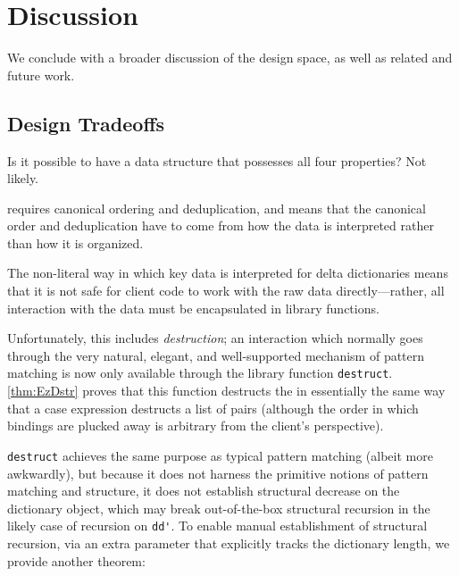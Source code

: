 \section{Discussion}
\label{sec:Discussion}

We conclude with a broader discussion of the design space, as well as related
and future work.

\subsection{Design Tradeoffs}
\label{sec:Discussion:Tradeoffs}

Is it possible to have a data structure that possesses all four properties?
%
Not likely.

\SemInj{} requires canonical ordering and deduplication, and \SemTot{} means that the canonical order and deduplication have to come from how the data is interpreted rather than how it is organized.


%
The non-literal way in which key data is interpreted for delta dictionaries means that it is not safe for client code to work with the raw data directly---rather, all interaction with the data must be
encapsulated in library functions.

Unfortunately, this includes \emph{destruction}; an interaction which
normally goes through the very natural, elegant, and well-supported mechanism of pattern matching is now
only available through the library function \verb+destruct+. \autoref{thm:EzDstr} proves that this function
destructs the \dd{} in essentially the same way that a case expression destructs a list of pairs (although
the order in which bindings are plucked away is arbitrary from the client's perspective).

\verb+destruct+ achieves the same purpose as typical pattern matching (albeit more awkwardly), but because it
does not harness the primitive notions of pattern matching and structure, it does not establish structural
decrease on the dictionary object, which may break out-of-the-box structural recursion in the likely case
of recursion on \verb+dd'+. To enable manual establishment of structural recursion, via an extra parameter that
explicitly tracks the dictionary length, we provide another theorem:

